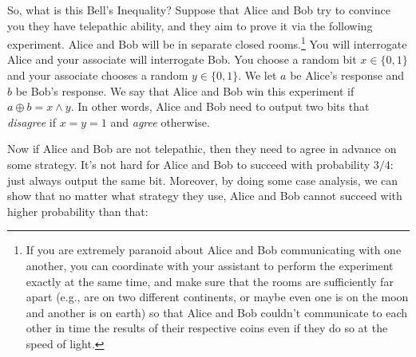 So, what is this Bell's Inequality? Suppose that Alice and Bob try to
convince you they have telepathic ability, and they aim to prove it via
the following experiment. Alice and Bob will be in separate closed
rooms.\footnote{If you are extremely paranoid about Alice and Bob
  communicating with one another, you can coordinate with your assistant
  to perform the experiment exactly at the same time, and make sure that
  the rooms are sufficiently far apart (e.g., are on two different
  continents, or maybe even one is on the moon and another is on earth)
  so that Alice and Bob couldn't communicate to each other in time the
  results of their respective coins even if they do so at the speed of
  light.} You will interrogate Alice and your associate will interrogate
Bob. You choose a random bit \(x\in\{0,1\}\) and your associate chooses
a random \(y\in\{0,1\}\). We let \(a\) be Alice's response and \(b\) be
Bob's response. We say that Alice and Bob win this experiment if
\(a \oplus b = x \wedge y\). In other words, Alice and Bob need to
output two bits that \emph{disagree} if \(x=y=1\) and \emph{agree}
otherwise.

Now if Alice and Bob are not telepathic, then they need to agree in
advance on some strategy. It's not hard for Alice and Bob to succeed
with probability \(3/4\): just always output the same bit. Moreover, by
doing some case analysis, we can show that no matter what strategy they
use, Alice and Bob cannot succeed with higher probability than that:

\hypertarget{bellthm}{}

